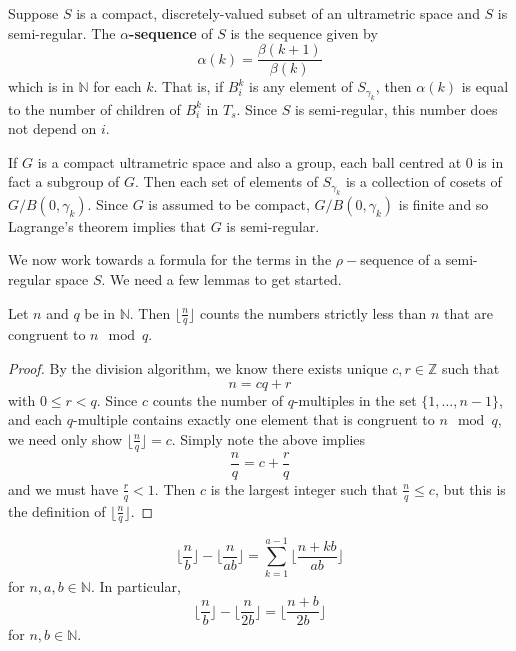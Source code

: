 \begin{definition}
Suppose $S$ is a compact, discretely-valued subset of an ultrametric space and $S$ is semi-regular. The \textbf{$\alpha$-sequence} of $S$ is the sequence given by \[\alpha(k)=\frac{\beta(k+1)}{\beta(k)}\] which is in $\mathbb{N}$ for each $k$. That is, if $B^k_i$ is any element of $S_{\gamma_k}$, then $\alpha(k)$ is equal to the number of children of $B^k_i$ in $T_s$. Since $S$ is semi-regular, this number does not depend on $i$.
\end{definition}

\begin{example}
\label{lagrange}	
	If $G$ is a compact ultrametric space and also a group, each ball centred at $0$ is in fact a subgroup of $G$. Then each set of elements of $S_{\gamma_k}$ is a collection of cosets of $G/B(0,\gamma_k)$. Since $G$ is assumed to be compact, $G/B(0,\gamma_k)$ is finite and so Lagrange's theorem implies that $G$ is semi-regular.
\end{example}

We now work towards a formula for the terms in the $\rho-$sequence of a semi-regular space $S$. We need a few lemmas to get started.\\
 
\begin{lemma}
Let $n$ and $q$ be in $\mathbb{N}$. Then $\lfloor\frac{n}{q} \rfloor$ counts the numbers strictly less than $n$ that are congruent to $n \mod q$.
\end{lemma}

\begin{proof}
By the division algorithm, we know there exists unique $c,r \in \mathbb{Z}$ such that \[n = cq + r\] with $0 \leq r < q$. Since $c$ counts the number of $q$-multiples in the set $\{1,\ldots,n-1\}$, and each $q$-multiple contains exactly one element that is congruent to $n \mod q$, we need only show $\lfloor\frac{n}{q} \rfloor = c$. Simply note the above implies  \[\frac{n}{q} = c + \frac{r}{q}\] and we must have   $\frac{r}{q} < 1$. Then $c$ is the largest integer such that $\frac{n}{q} \leq c$, but this is the definition of $\lfloor\frac{n}{q} \rfloor$.
\end{proof}


\begin{lemma}
\label{semi-regular formula}
\[\lfloor\frac{n}{b} \rfloor - \lfloor \frac{n}{ab} \rfloor = \sum_{k=1}^{a-1} \lfloor \frac{n + kb}{ab} \rfloor\] for $n,a,b \in \mathbb{N}$. In particular, 
\[\lfloor\frac{n}{b} \rfloor - \lfloor \frac{n}{2b} \rfloor= \lfloor \frac{n+b}{2b} \rfloor\] for  $n,b \in \mathbb{N}$.
\end{lemma}

